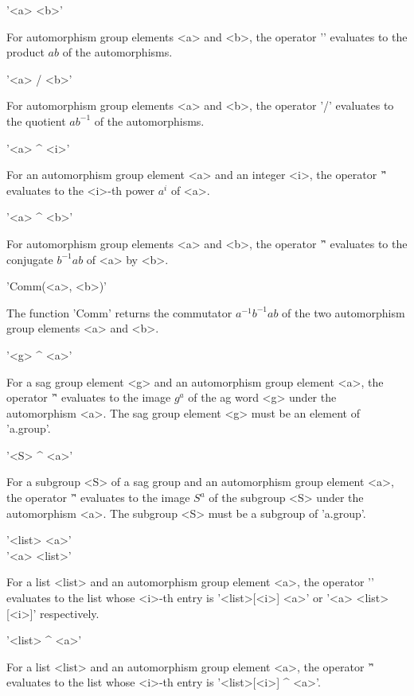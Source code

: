 '<a> {\*} <b>'

For automorphism group elements <a> and <b>, the operator '\*' evaluates to the
product $a b$ of the automorphisms.

\bigskip

'<a> / <b>'

For automorphism group elements <a> and <b>, the operator '/' evaluates to the
quotient $a b^{-1}$ of the automorphisms.

\bigskip

'<a> {\^} <i>'

For an automorphism group element <a> and an integer <i>, the operator '\^'
evaluates to the <i>-th power $a^i$ of <a>.

\bigskip

'<a> {\^} <b>'

For automorphism group elements <a> and <b>, the operator '\^' evaluates to the
conjugate $b^{-1} a b$ of <a> by <b>.

\bigskip

'Comm(<a>, <b>)'

The function 'Comm' returns the commutator $a^{-1} b^{-1} a b$
of the two automorphism group elements <a> and <b>.

\bigskip

'<g> {\^} <a>'

For a sag group element <g> and an automorphism group element <a>, the operator
'\^' evaluates to the image $g^a$ of the ag word <g> under the automorphism <a>.
The sag group element <g> must be an element of 'a.group'.

\bigskip

'<S> {\^} <a>'

For a subgroup <S> of a sag group and an automorphism group element <a>, the
operator '\^' evaluates to the image $S^a$ of the subgroup <S> under the
automorphism <a>.  The subgroup <S> must be a subgroup of 'a.group'.

\bigskip

'<list> {\*} <a>' \\
'<a> {\*} <list>'

For a list <list> and an automorphism group element <a>, the operator '\*'
evaluates to the list whose <i>-th entry is '<list>[<i>] {\*} <a>' or '<a>
{\*} <list>[<i>]' respectively.

\bigskip

'<list> {\^} <a>'

For a list <list> and an automorphism group element <a>, the operator '\^'
evaluates to the list whose <i>-th entry is '<list>[<i>] {\^} <a>'.

